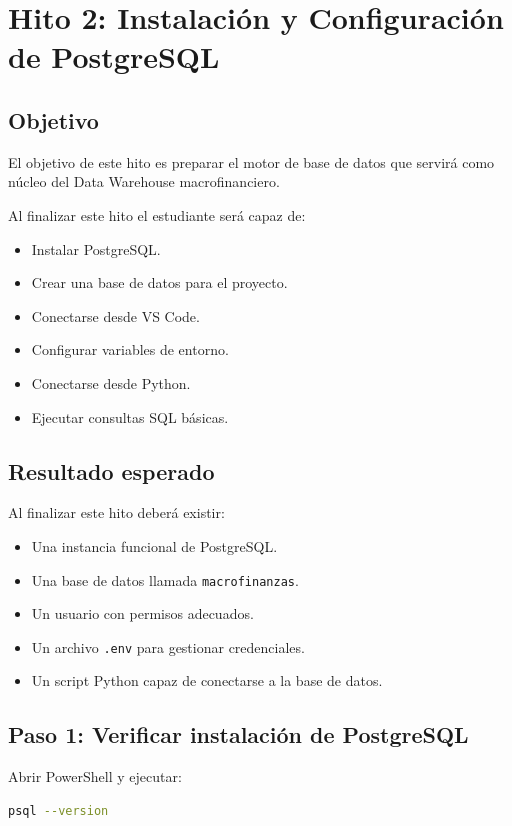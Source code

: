 \chapter{Hito 2: Instalación y Configuración de PostgreSQL}

\section{Objetivo}

El objetivo de este hito es preparar el motor de base de datos que servirá como núcleo del Data Warehouse macrofinanciero.

Al finalizar este hito el estudiante será capaz de:

\begin{itemize}
\item Instalar PostgreSQL.
\item Crear una base de datos para el proyecto.
\item Conectarse desde VS Code.
\item Configurar variables de entorno.
\item Conectarse desde Python.
\item Ejecutar consultas SQL básicas.
\end{itemize}

\section{Resultado esperado}

Al finalizar este hito deberá existir:

\begin{itemize}
\item Una instancia funcional de PostgreSQL.
\item Una base de datos llamada \texttt{macrofinanzas}.
\item Un usuario con permisos adecuados.
\item Un archivo \texttt{.env} para gestionar credenciales.
\item Un script Python capaz de conectarse a la base de datos.
\end{itemize}

\section{Paso 1: Verificar instalación de PostgreSQL}

Abrir PowerShell y ejecutar:

\begin{lstlisting}[language=bash]
psql --version
\end{lstlisting}


